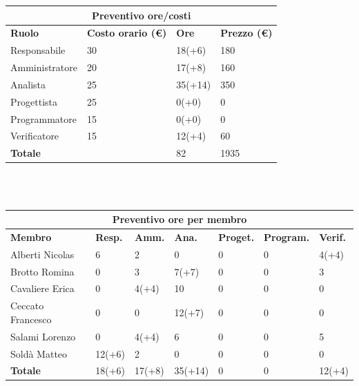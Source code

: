 \documentclass[a4paper, 12pt]{article}
\begin{document}
\begin{center}
	\begin{tabularx}{\textwidth}{|X|X|X|X|}
		\hline
		\multicolumn{4}{|c|}{\textbf{Preventivo ore/costi}}                                      \\
		\hline
		\hline
		\textbf{Ruolo}  & \textbf{Costo orario (\euro)} & \textbf{Ore} & \textbf{Prezzo (\euro)} \\
		\hline
		Responsabile    & 30                            & 18(+6)       & 180                     \\
		\hline
		Amministratore  & 20                            & 17(+8)       & 160                     \\
		\hline
		Analista        & 25                            & 35(+14)      & 350                     \\
		\hline
		Progettista     & 25                            & 0(+0)        & 0                       \\
		\hline
		Programmatore   & 15                            & 0(+0)        & 0                       \\
		\hline
		Verificatore    & 15                            & 12(+4)       & 60                      \\
		\hline
		\hline
		\textbf{Totale} &                               & 82           & 1935                    \\
		\hline
	\end{tabularx}\\[8pt]
	\mbox{}\\
\end{center}

\begin{center}
	\begin{tabularx}{\textwidth}{|X|X|X|X|X|X|X|}
		\hline
		\multicolumn{7}{|c|}{\textbf{Preventivo ore per membro}}                                      \\
		\hline
		\hline
		\textbf{Membro}  & \textbf{Resp.} & \textbf{Amm.} & \textbf{Ana.} &
		\textbf{Proget.} & \textbf{Program.} & \textbf{Verif.} \\
		\hline
		Alberti Nicolas    	&6 	&2	&0	&0	&0	&4(+4)	\\
		\hline
		Brotto Romina    	&0 	&3	&7(+7)	&0	&0	&3	\\
		\hline
		Cavaliere Erica    	&0 	&4(+4)  &10  &0 &0 &0	\\
		\hline
		Ceccato Francesco   &0 	&0  &12(+7)  &0 &0 &0	\\
		\hline
		Salami Lorenzo    	&0 	&4(+4)  &6 &0 &0 &5	\\
		\hline
		Soldà Matteo    	&12(+6)	&2  &0  &0 &0 &0	\\
		\hline
		\hline
		\textbf{Totale} 	& 18(+6) & 17(+8) & 35(+14) & 0 & 0 & 12(+4)	\\
		\hline
	\end{tabularx}\\[8pt]
	\mbox{}\\
\end{center}
\end{document}

